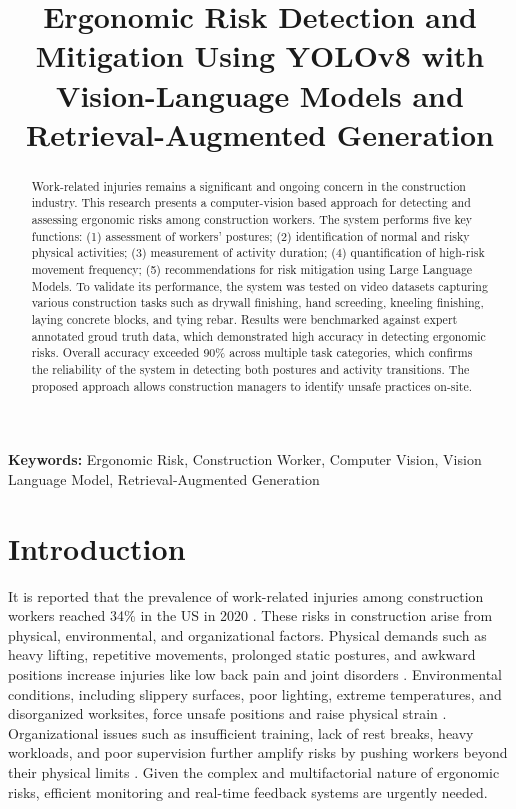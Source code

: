 \documentclass[11pt]{article}
\title{Ergonomic Risk Detection and Mitigation Using YOLOv8 with Vision-Language Models and Retrieval-Augmented Generation}
\author{}
\date{}
\begin{document}
\linenumbers %

\maketitle    

\begin{abstract}
Work-related injuries remains a significant and ongoing concern in the construction industry. This research presents a computer-vision based approach for detecting and assessing ergonomic risks among construction workers. The system performs five key functions: (1) assessment of workers' postures; (2) identification of normal and risky physical activities; (3) measurement of activity duration; (4) quantification of high-risk movement frequency; (5) recommendations for risk mitigation using Large Language Models. To validate its performance, the system was tested on video datasets capturing various construction tasks such as drywall finishing, hand screeding, kneeling finishing, laying concrete blocks, and tying rebar. Results were benchmarked against expert annotated groud truth data, which demonstrated high accuracy in detecting ergonomic risks. Overall accuracy exceeded 90\% across multiple task categories, which confirms the reliability of the system in detecting both postures and activity transitions. The proposed approach allows construction managers to identify unsafe practices on-site.
\end{abstract}


\noindent \textbf{Keywords:} Ergonomic Risk, Construction Worker, Computer Vision, Vision Language Model, Retrieval-Augmented Generation

%
%
%

\newpage
\section{Introduction}

It is reported that the prevalence of work-related injuries among construction workers reached 34\% in the US in 2020 \citep{antwi2020construction}. These risks in construction arise from physical, environmental, and organizational factors. Physical demands such as heavy lifting, repetitive movements, prolonged static postures, and awkward positions increase injuries like low back pain and joint disorders \citep{singh2024construction}. Environmental conditions, including slippery surfaces, poor lighting, extreme temperatures, and disorganized worksites, force unsafe positions and raise physical strain \citep{ishwarya2021analysis}. Organizational issues such as insufficient training, lack of rest breaks, heavy workloads, and poor supervision further amplify risks by pushing workers beyond their physical limits \citep{mohan2018identifying}. Given the complex and multifactorial nature of ergonomic risks, efficient monitoring and real-time feedback systems are urgently needed.
\end{document}
